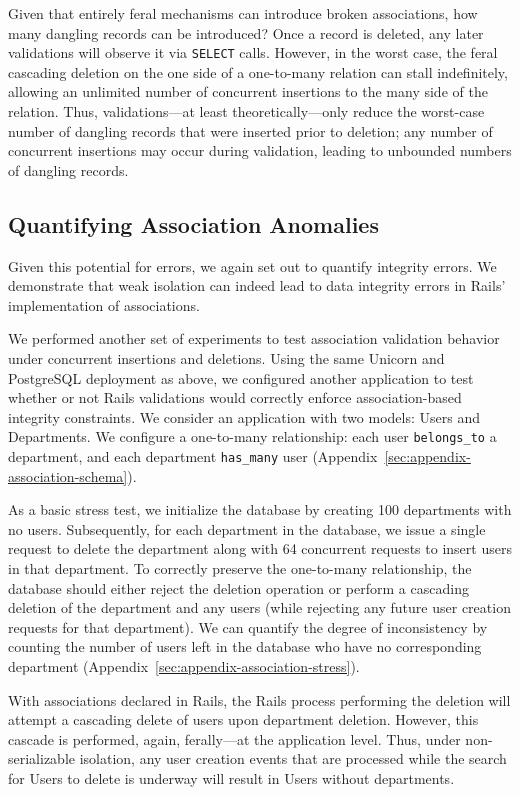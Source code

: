  Given that entirely
feral mechanisms can introduce broken associations, how many dangling
records can be introduced? Once a record is deleted, any later
validations will observe it via \texttt{SELECT} calls. However, in the
worst case, the feral cascading deletion on the one side of a
one-to-many relation can stall indefinitely, allowing an unlimited
number of concurrent insertions to the many side of the
relation. Thus, validations---at least theoretically---only reduce the
worst-case number of dangling records that were inserted prior to
deletion; any number of concurrent insertions may occur during
validation, leading to unbounded numbers of dangling records.

\subsection{Quantifying Association Anomalies}

Given this potential for errors, we again set out to quantify
integrity errors. We demonstrate that weak isolation can indeed lead
to data integrity errors in Rails' implementation of associations.

We performed another set of experiments to test association validation
behavior under concurrent insertions and deletions. Using the same
Unicorn and PostgreSQL deployment as above, we configured another
application to test whether or not Rails validations would correctly
enforce association-based integrity constraints. We consider an
application with two models: Users and Departments. We configure a
one-to-many relationship: each user \texttt{belongs\_to} a department,
and each department \texttt{has\_many} user
(Appendix~\ref{sec:appendix-association-schema}).

As a basic stress test, we initialize the database by creating 100
departments with no users. Subsequently, for each department in the
database, we issue a single request to delete the department along
with 64 concurrent requests to insert users in that department. To
correctly preserve the one-to-many relationship, the database should
either reject the deletion operation or perform a cascading deletion
of the department and any users (while rejecting any future user
creation requests for that department). We can quantify the degree of
inconsistency by counting the number of users left in the database who
have no corresponding department (Appendix~\ref{sec:appendix-association-stress}).

With associations declared in Rails, the Rails process performing the
deletion will attempt a cascading delete of users upon department
deletion. However, this cascade is performed, again, ferally---at the
application level. Thus, under non-serializable isolation, any user creation
events that are processed while the search for Users to delete is
underway will result in Users without departments.

